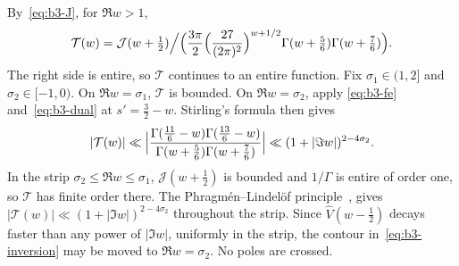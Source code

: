 \documentclass[11pt]{article}
\numberwithin{equation}{section}
\begin{document}
By~\eqref{eq:b3-J}, for $\Re w>1$,
\begin{equation}\label{eq:d116}
 \mathcal T(w)=\mathcal J(w+\tfrac12)\Big/\Bigl(\frac{3\pi}2
 \Bigl(\frac{27}{(2\pi)^2}\Bigr)^{w+1/2}\Gamma(w+\tfrac56)
 \Gamma(w+\tfrac76)\Bigr).
\end{equation}
The right side is entire, so $\mathcal T$ continues to an entire
function. Fix $\sigma_1\in(1,2]$ and $\sigma_2\in[-1,0)$. On
$\Re w=\sigma_1$, $\mathcal T$ is bounded. On $\Re w=\sigma_2$, apply
\eqref{eq:b3-fe} and~\eqref{eq:b3-dual} at $s'=\frac32-w$. Stirling's
formula then gives
\begin{equation}\label{eq:d117}
 |\mathcal T(w)|\ll\Bigl|\frac{\Gamma(\frac{11}6-w)\Gamma(\frac{13}6-w)}
 {\Gamma(w+\frac56)\Gamma(w+\frac76)}\Bigr|
 \ll(1+|\Im w|)^{2-4\sigma_2}.
\end{equation}
In the strip $\sigma_2\le\Re w\le\sigma_1$, $\mathcal J(w+\frac12)$ is
bounded and $1/\Gamma$ is entire of order one, so $\mathcal T$ has finite
order there. The Phragm\'en--Lindel\"of principle~\cite{PL08}, \cite[\S5.65]{Tit39} gives
$|\mathcal T(w)|\ll(1+|\Im w|)^{2-4\sigma_2}$ throughout the strip. Since
$\widehat V(w-\frac12)$ decays faster than any power of $|\Im w|$,
uniformly in the strip, the contour in~\eqref{eq:b3-inversion} may be
moved to $\Re w=\sigma_2$. No poles are crossed.
\end{document}
